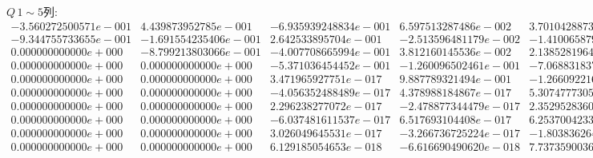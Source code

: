 \begin{landscape}
\newpage
$Q\,1\sim 5$列:
\[
\begin{matrix}
-3.560272500571e-001 & 4.439873952785e-001 & -6.935939248834e-001 & 6.597513287486e-002 & 3.701042887335e-001\\-9.344755733655e-001 & -1.691554235406e-001 & 2.642533895704e-001 & -2.513596481179e-002 & -1.410065879813e-001\\0.000000000000e+000 & -8.799213803066e-001 & -4.007708665994e-001 & 3.812160145536e-002 & 2.138528196492e-001\\0.000000000000e+000 & 0.000000000000e+000 & -5.371036454452e-001 & -1.260096502461e-001 & -7.068831837949e-001\\0.000000000000e+000 & 0.000000000000e+000 & 3.471965927751e-017 & 9.887789321494e-001 & -1.266092216426e-001\\0.000000000000e+000 & 0.000000000000e+000 & -4.056352488489e-017 & 4.378988184867e-017 & 5.307477730505e-001\\0.000000000000e+000 & 0.000000000000e+000 & 2.296238277072e-017 & -2.478877344479e-017 & 2.352952836071e-017\\0.000000000000e+000 & 0.000000000000e+000 & -6.037481611537e-017 & 6.517693104408e-017 & 6.253700423368e-017\\0.000000000000e+000 & 0.000000000000e+000 & 3.026049645531e-017 & -3.266736725224e-017 & -1.803836264252e-017\\0.000000000000e+000 & 0.000000000000e+000 & 6.129185054653e-018 & -6.616690490620e-018 & 7.737359003671e-017\\
\end{matrix}\]


\end{landscape}
